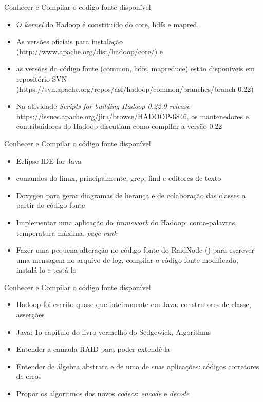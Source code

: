 \begin{frame}{Conhecer e Compilar o código fonte disponível}
\begin{itemize}
        \item<2-> O \emph{kernel} do Hadoop é constituído do core, hdfs e mapred.
        \item<3-> As versões oficiais para instalação (http://www.apache.org/dist/hadoop/core/) e
        \item<4-> as versões do código fonte (common, hdfs, mapreduce) estão disponíveis em repositório SVN (https://svn.apache.org/repos/asf/hadoop/common/branches/branch-0.22) 
        \item<5-> Na atividade \emph{Scripts for building Hadoop 0.22.0 release}  https://issues.apache.org/jira/browse/HADOOP-6846, os mantenedores e contribuidores do Hadoop discutiam como compilar a versão 0.22
     \end{itemize}
  \end{frame}

  \begin{frame}{Conhecer e Compilar o código fonte disponível}
     \begin{itemize}
        \item<1-> Eclipse IDE for Java
        \item<2-> comandos do linux, principalmente, grep, find e editores de texto
        \item<3-> Doxygen para gerar diagramas de herança e de colaboração das classes a partir do código fonte
        \item<4-> Implementar uma aplicação do \emph{framework} do Hadoop: conta-palavras, temperatura máxima, \emph{page rank}
        \item<5-> Fazer uma pequena alteração no código fonte do RaidNode () para escrever uma mensagem no arquivo de log, compilar o código fonte modificado, instalá-lo e testá-lo
     \end{itemize}
  \end{frame}

  \begin{frame}{Conhecer e Compilar o código fonte disponível}
     \begin{itemize}
        \item<1-> Hadoop foi escrito quase que inteiramente em Java: construtores de classe, asserções
        \item<2-> Java: 1o capítulo do livro vermelho do Sedgewick, Algorithms
        \item<3-> Entender a camada RAID para poder extendê-la
        \item<4-> Entender de álgebra abstrata e de uma de suas aplicações: códigos corretores de erros
        \item<5-> Propor os algoritmos dos novos \emph{codecs}: \emph{encode} e \emph{decode}
     \end{itemize}
  \end{frame}

